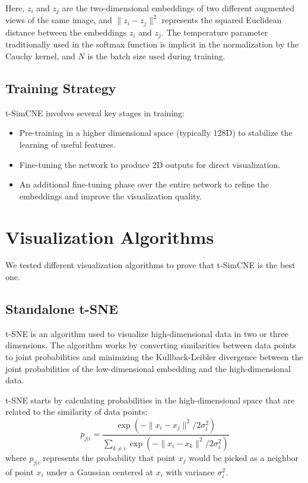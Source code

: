 Here, $z_i$ and $z_j$ are the two-dimensional embeddings of two different augmented views of the same image, and $\|z_i - z_j\|^2$ represents the squared Euclidean distance between the embeddings $z_i$ and $z_j$. The temperature parameter traditionally used in the softmax function is implicit in the normalization by the Cauchy kernel, and $N$ is the batch size used during training.


\subsection{Training Strategy}
t-SimCNE involves several key stages in training:
\begin{itemize}
    \item Pre-training in a higher dimensional space (typically 128D) to stabilize the learning of useful features.
    \item Fine-tuning the network to produce 2D outputs for direct visualization.
    \item An additional fine-tuning phase over the entire network to refine the embeddings and improve the visualization quality.
\end{itemize}


\section{Visualization Algorithms}
We tested different visualization algorithms to prove that t-SimCNE is the best one.

\subsection{Standalone t-SNE}

t-SNE is an algorithm used to visualize high-dimensional data in two or three dimensions. The algorithm works by converting similarities between data points to joint probabilities and minimizing the Kullback-Leibler divergence between the joint probabilities of the low-dimensional embedding and the high-dimensional data.

t-SNE starts by calculating probabilities in the high-dimensional space that are related to the similarity of data points:
\[
p_{j|i} = \frac{\exp(-\|x_i - x_j\|^2 / 2\sigma_i^2)}{\sum_{k \neq i} \exp(-\|x_i - x_k\|^2 / 2\sigma_i^2)}
\]
where \(p_{j|i}\) represents the probability that point \(x_j\) would be picked as a neighbor of point \(x_i\) under a Gaussian centered at \(x_i\) with variance \(\sigma_i^2\).

